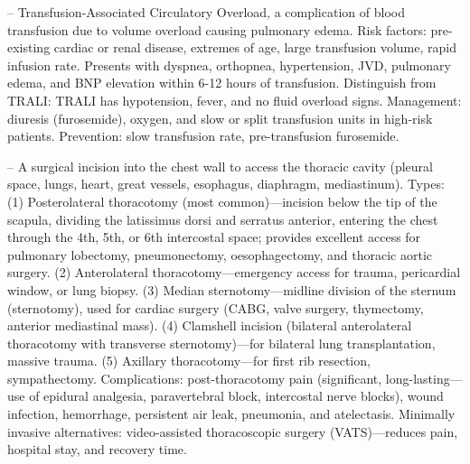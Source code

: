-- Transfusion-Associated Circulatory Overload, a complication of blood transfusion due to volume overload causing pulmonary edema. Risk factors: pre-existing cardiac or renal disease, extremes of age, large transfusion volume, rapid infusion rate. Presents with dyspnea, orthopnea, hypertension, JVD, pulmonary edema, and BNP elevation within 6-12 hours of transfusion. Distinguish from TRALI: TRALI has hypotension, fever, and no fluid overload signs. Management: diuresis (furosemide), oxygen, and slow or split transfusion units in high-risk patients. Prevention: slow transfusion rate, pre-transfusion furosemide.

-- A surgical incision into the chest wall to access the thoracic cavity (pleural space, lungs, heart, great vessels, esophagus, diaphragm, mediastinum). Types: (1) Posterolateral thoracotomy (most common)—incision below the tip of the scapula, dividing the latissimus dorsi and serratus anterior, entering the chest through the 4th, 5th, or 6th intercostal space; provides excellent access for pulmonary lobectomy, pneumonectomy, oesophagectomy, and thoracic aortic surgery. (2) Anterolateral thoracotomy—emergency access for trauma, pericardial window, or lung biopsy. (3) Median sternotomy—midline division of the sternum (sternotomy), used for cardiac surgery (CABG, valve surgery, thymectomy, anterior mediastinal mass). (4) Clamshell incision (bilateral anterolateral thoracotomy with transverse sternotomy)—for bilateral lung transplantation, massive trauma. (5) Axillary thoracotomy—for first rib resection, sympathectomy. Complications: post-thoracotomy pain (significant, long-lasting—use of epidural analgesia, paravertebral block, intercostal nerve blocks), wound infection, hemorrhage, persistent air leak, pneumonia, and atelectasis. Minimally invasive alternatives: video-assisted thoracoscopic surgery (VATS)—reduces pain, hospital stay, and recovery time.


